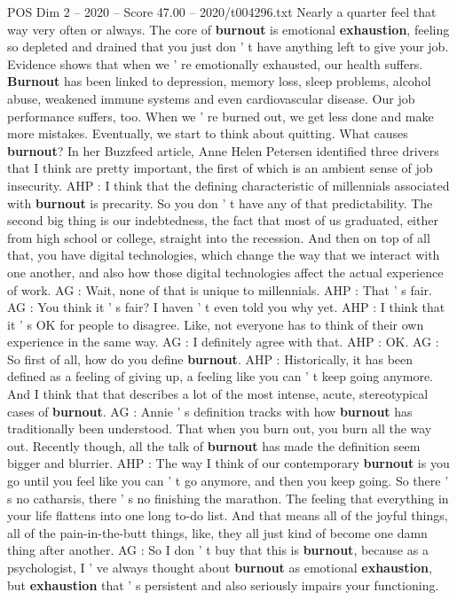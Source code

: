 \begin{textsample}{POS Dim 2 – 2020 – Score 47.00 – 2020/t004296.txt}
Nearly a quarter feel that way very often or always.
The core of \textbf{burnout} is emotional \textbf{exhaustion}, feeling so depleted and drained that you just don ' t have anything left to give your job.
Evidence shows that when we ' re emotionally exhausted, our health suffers. \textbf{Burnout} has been linked to depression, memory loss, sleep problems, alcohol abuse, weakened immune systems and even cardiovascular disease.
Our job performance suffers, too.
When we ' re burned out, we get less done and make more mistakes.
Eventually, we start to think about quitting.
What causes \textbf{burnout}?
In her Buzzfeed article, Anne Helen Petersen identified three drivers that I think are pretty important, the first of which is an ambient sense of job insecurity.
AHP : I think that the defining characteristic of millennials associated with \textbf{burnout} is precarity.
So you don ' t have any of that predictability.
The second big thing is our indebtedness, the fact that most of us graduated, either from high school or college, straight into the recession.
And then on top of all that, you have digital technologies, which change the way that we interact with one another, and also how those digital technologies affect the actual experience of work.
AG : Wait, none of that is unique to millennials.
AHP : That ' s fair.
AG : You think it ' s fair?
I haven ' t even told you why yet.
AHP : I think that it ' s OK for people to disagree.
Like, not everyone has to think of their own experience in the same way.
AG : I definitely agree with that.
AHP : OK.
AG : So first of all, how do you define \textbf{burnout}.
AHP : Historically, it has been defined as a feeling of giving up, a feeling like you can ' t keep going anymore.
And I think that that describes a lot of the most intense, acute, stereotypical cases of \textbf{burnout}.
AG : Annie ' s definition tracks with how \textbf{burnout} has traditionally been understood.
That when you burn out, you burn all the way out.
Recently though, all the talk of \textbf{burnout} has made the definition seem bigger and blurrier.
AHP : The way I think of our contemporary \textbf{burnout} is you go until you feel like you can ' t go anymore, and then you keep going.
So there ' s no catharsis, there ' s no finishing the marathon.
The feeling that everything in your life flattens into one long to-do list.
And that means all of the joyful things, all of the pain-in-the-butt things, like, they all just kind of become one damn thing after another.
AG : So I don ' t buy that this is \textbf{burnout}, because as a psychologist, I ' ve always thought about \textbf{burnout} as emotional \textbf{exhaustion}, but \textbf{exhaustion} that ' s persistent and also seriously impairs your functioning.

\end{textsample}

